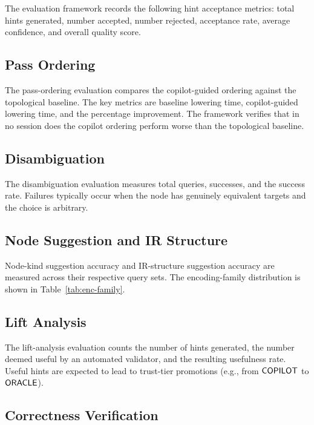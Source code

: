 \documentclass[11pt]{article}
\begin{document}
The evaluation framework records the following hint acceptance metrics:
total hints generated, number accepted, number rejected, acceptance
rate, average confidence, and overall quality score.

\subsection{Pass Ordering}\label{sec:exp-pass}

The pass-ordering evaluation compares the copilot-guided ordering
against the topological baseline.  The key metrics are baseline
lowering time, copilot-guided lowering time, and the percentage
improvement.  The framework verifies that in no session does the
copilot ordering perform worse than the topological baseline.

\subsection{Disambiguation}\label{sec:exp-disambig}

The disambiguation evaluation measures total queries, successes, and
the success rate.  Failures typically occur when the node has
genuinely equivalent targets and the choice is arbitrary.

\subsection{Node Suggestion and IR Structure}\label{sec:exp-node}

Node-kind suggestion accuracy and IR-structure suggestion accuracy
are measured across their respective query sets.
The encoding-family distribution is shown in Table~\ref{tab:enc-family}.

\subsection{Lift Analysis}\label{sec:exp-lift}

The lift-analysis evaluation counts the number of hints generated,
the number deemed useful by an automated validator, and the resulting
usefulness rate.  Useful hints are expected to lead to trust-tier
promotions (e.g., from $\mathsf{COPILOT}$ to $\mathsf{ORACLE}$).

\subsection{Correctness Verification}\label{sec:exp-correct}
\end{document}
